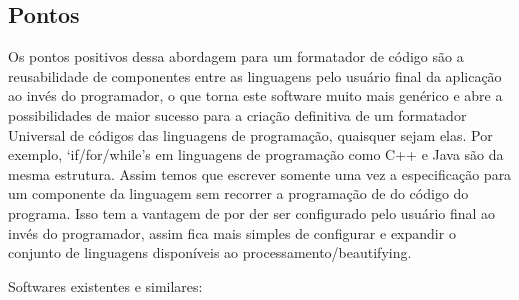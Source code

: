 \subsection{Pontos}

    Os pontos positivos dessa abordagem para um formatador de código são a reusabilidade de
    componentes entre as linguagens pelo usuário final da aplicação ao invés do programador, o que
    torna este software muito mais genérico e abre a possibilidades de maior sucesso para a criação
    definitiva de um formatador Universal de códigos das linguagens de programação, quaisquer sejam
    elas. Por exemplo, `if/for/while'\textquotesingle s em linguagens de programação como C++ e Java são da mesma
    estrutura. Assim temos que escrever somente uma vez a especificação para um componente da
    linguagem sem recorrer a programação de do código do programa. Isso tem a vantagem de por der
    ser configurado pelo usuário final ao invés do programador, assim fica mais simples de
    configurar e expandir o conjunto de linguagens disponíveis ao processamento/beautifying.

    Softwares existentes e similares:

